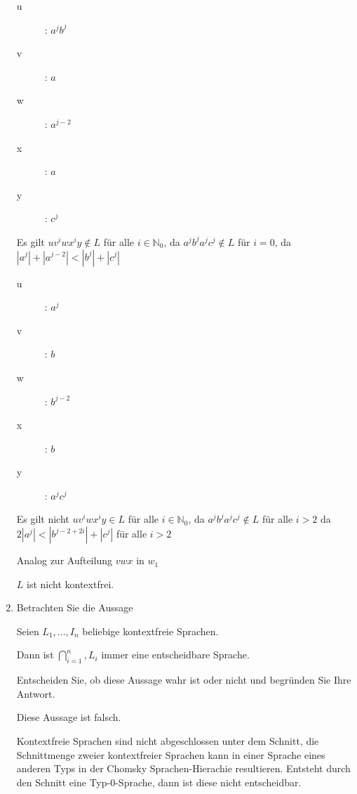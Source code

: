 \documentclass{bschlangaul-aufgabe}
\begin{document}
\begin{enumerate}
\begin{bAntwort}

\begin{description}
\item[u]: $a^j b^j$
\item[v]: $a$
\item[w]: $a^{j - 2}$
\item[x]: $a$
\item[y]: $c^j$
\end{description}

Es gilt $uv^iwx^iy \notin L$ für alle $i \in \mathbb{N}_0$, da $a^j
b^j a^j c^j \notin L$ für $i = 0$, da
$|a^j| + |a^{j-2}| < |b^j| + |c^j|$


\begin{description}
\item[u]: $a^j$
\item[v]: $b$
\item[w]: $b^{j - 2}$
\item[x]: $b$
\item[y]: $a^j c^j$
\end{description}

Es gilt nicht $uv^iwx^iy \in L$ für alle $i \in \mathbb{N}_0$, da $a^j
b^j a^j c^j \notin L$ für alle $i > 2$ da
$2|a^j| < |b^{j - 2 + 2i}| + |c^j|$ für alle $i > 2$


Analog zur Aufteilung $vwx$ in $w_1$

\Rightarrow $L$ ist nicht kontextfrei.
\end{bAntwort}


\item Betrachten Sie die Aussage

\bigskip

\centerline{Seien $L_1, \dots, I_n$ beliebige kontextfreie Sprachen.}

\centerline{Dann ist $\bigcap_{i=1}^n, L_i$ immer eine entscheidbare
Sprache.}

\bigskip

Entscheiden Sie, ob diese Aussage wahr ist oder nicht und begründen Sie
Ihre Antwort.

\begin{bAntwort}
Diese Aussage ist falsch.

Kontextfreie Sprachen sind nicht abgeschlossen unter dem Schnitt, \dh
die Schnittmenge zweier kontextfreier Sprachen kann in einer Sprache
eines anderen Typs in der Chomsky Sprachen-Hierachie resultieren.
Entsteht durch den Schnitt eine Typ-0-Sprache, dann ist diese nicht
entscheidbar.
\end{bAntwort}


\end{enumerate}
\end{document}
